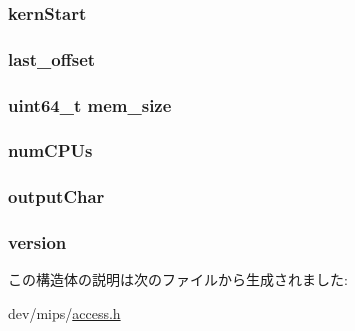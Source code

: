 \label{structMipsAccess_af38844b39dfe6f789ea85120ff54cb01}
\hypertarget{structMipsAccess_abb644efec07fab1ae32a4ede78ad6375}{
\subsubsection[{kernStart}]{ {\bf kernStart}}}
\label{structMipsAccess_abb644efec07fab1ae32a4ede78ad6375}
\hypertarget{structMipsAccess_a589399e9f33ae0028f3868360bf5a665}{
\subsubsection[{last\_\-offset}]{ {\bf last\_\-offset}}}
\label{structMipsAccess_a589399e9f33ae0028f3868360bf5a665}
\hypertarget{structMipsAccess_ae177731dc45fab0258bb6f72ebf37785}{
\subsubsection[{mem\_\-size}]{\setlength{\rightskip}{0pt plus 5cm}uint64\_\-t {\bf mem\_\-size}}}
\label{structMipsAccess_ae177731dc45fab0258bb6f72ebf37785}
\hypertarget{structMipsAccess_a62fe5772fdad74fda85b8510032153e0}{
\subsubsection[{numCPUs}]{ {\bf numCPUs}}}
\label{structMipsAccess_a62fe5772fdad74fda85b8510032153e0}
\hypertarget{structMipsAccess_a7bc0b92f0de9e6a4021ddbb2f34a5da1}{
\subsubsection[{outputChar}]{ {\bf outputChar}}}
\label{structMipsAccess_a7bc0b92f0de9e6a4021ddbb2f34a5da1}
\hypertarget{structMipsAccess_acd99bb05ca015e7d74448acb1deba7ca}{
\subsubsection[{version}]{ {\bf version}}}
\label{structMipsAccess_acd99bb05ca015e7d74448acb1deba7ca}


この構造体の説明は次のファイルから生成されました:\begin{DoxyCompactItemize}
\item 
dev/mips/\hyperlink{mips_2access_8h}{access.h}\end{DoxyCompactItemize}
